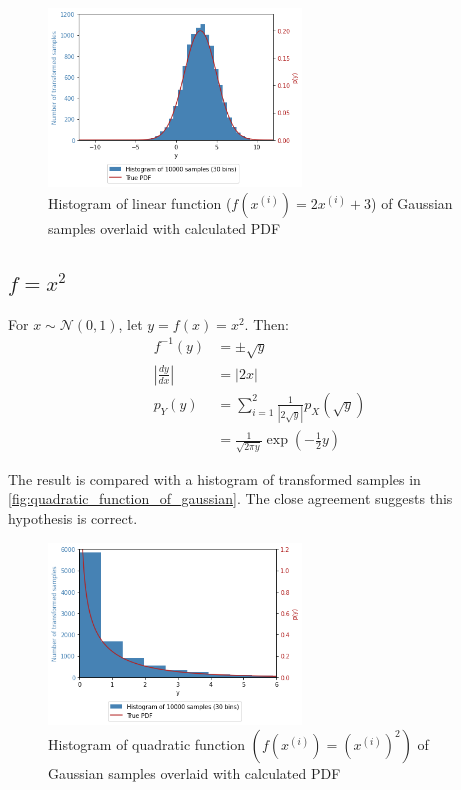 \documentclass[a4paper]{article}
\begin{document}
\begin{figure}[h]
    \centering
    \includegraphics[width=0.6\textwidth]{figures/linear_function_of_gaussian.png}
    \caption{Histogram of linear function ($f(x^{(i)}) = 2x^{(i)} + 3$) of Gaussian samples overlaid with
    calculated PDF}
    \label{fig:linear_function_of_gaussian}
\end{figure}


\subsection{$f = x^2$}
For $x \sim \mathcal{N}(0, 1)$, let $y = f(x) = x ^ 2$. Then:
\begin{align*}
    f^{-1}(y) &= \pm \sqrt{y} \\
    \left|\frac{dy}{dx}\right| &= |2x| \\
    p_Y(y) &= \sum_{i=1}^{2} \frac{1}{|2 \sqrt{y}|} p_X \left( \sqrt{y} \right) \\
    &= \frac{1}{\sqrt{2\pi y}} \exp{\left( -\frac{1}{2} y \right)}
\end{align*}

The result is compared with a histogram of transformed samples in \autoref{fig:quadratic_function_of_gaussian}. The
close agreement suggests this hypothesis is correct.

\begin{figure}[h]
    \centering
    \includegraphics[width=0.6\textwidth]{figures/quadratic_function_of_gaussian.png}
    \caption{Histogram of quadratic function $\left(f(x^{(i)}) = \left(x^{(i)}\right)^2\right)$ of Gaussian samples
    overlaid with calculated PDF}
    \label{fig:quadratic_function_of_gaussian}
\end{figure}
\end{document}

